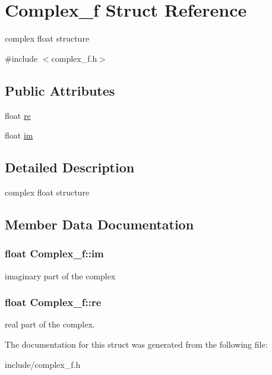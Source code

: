 \hypertarget{structComplex__f}{}\section{Complex\+\_\+f Struct Reference}
\label{structComplex__f}


complex float structure  




{\ttfamily \#include $<$complex\+\_\+f.\+h$>$}

\subsection*{Public Attributes}
\begin{DoxyCompactItemize}
\item 
float \hyperlink{structComplex__f_af0322eea7a75157c20129910e6d04057}{re}
\item 
float \hyperlink{structComplex__f_a257673d7e60735619fa0fcfa9882d670}{im}
\end{DoxyCompactItemize}


\subsection{Detailed Description}
complex float structure 

\subsection{Member Data Documentation}
\subsubsection[{\texorpdfstring{im}{im}}]{\setlength{\rightskip}{0pt plus 5cm}float Complex\+\_\+f\+::im}\hypertarget{structComplex__f_a257673d7e60735619fa0fcfa9882d670}{}\label{structComplex__f_a257673d7e60735619fa0fcfa9882d670}
imaginary part of the complex 
\subsubsection[{\texorpdfstring{re}{re}}]{\setlength{\rightskip}{0pt plus 5cm}float Complex\+\_\+f\+::re}\hypertarget{structComplex__f_af0322eea7a75157c20129910e6d04057}{}\label{structComplex__f_af0322eea7a75157c20129910e6d04057}
real part of the complex. 

The documentation for this struct was generated from the following file\+:\begin{DoxyCompactItemize}
\item 
include/complex\+\_\+f.\+h\end{DoxyCompactItemize}
